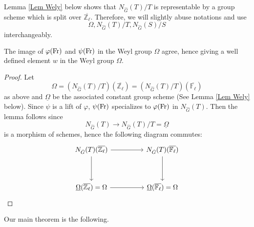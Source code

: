 \begin{remark}
	Lemma \ref{Lem Wely} below shows that $N_{\hat{G}}(T)/T$ is representable by a group scheme which is split over $\overline{\mathbb{Z}_{\ell}}$. Therefore, we will slightly abuse notations and use 
	$$\Omega, N_{\hat{G}}(T)/T, N_{\hat{G}}(S)/S$$
	interchangeably.
\end{remark}

\begin{lemma}\label{Lemma w}
	The image of $\varphi(\operatorname{Fr})$ and $\psi(\operatorname{Fr})$ in the Weyl group $\Omega$ agree, hence giving a well defined element $w$ in the Weyl group $\Omega$.
\end{lemma}

\begin{proof}
	Let 
	$$\Omega=\left(N_{\hat{G}}(T)/T\right)(\overline{\mathbb{Z}_{\ell}}) = \left(N_{\hat{G}}(T)/T\right)(\overline{\mathbb{F}_{\ell}})$$ 
	as above and $\underline{\Omega}$ be the associated constant group scheme (See Lemma \ref{Lem Wely} below). Since $\psi$ is a lift of $\varphi$, $\psi(\operatorname{Fr})$ specializes to $\varphi(\operatorname{Fr})$ in $N_{\hat{G}}(T)$. Then the lemma follows since 
	$$N_{\hat{G}}(T) \to N_{\hat{G}}(T)/T=\underline{\Omega}$$
	is a morphism of schemes, hence the following diagram commutes:
	$$
	\begin{tikzcd}
		{N_{\hat{G}}(T)(\overline{\mathbb{Z}_\ell})} && {N_{\hat{G}}(T)(\overline{\mathbb{F}_\ell})} \\
		\\
		{\underline{\Omega}(\overline{\mathbb{Z}_\ell})=\Omega} && {\underline{\Omega}(\overline{\mathbb{F}_\ell})=\Omega}
		\arrow[from=1-1, to=1-3]
		\arrow[from=1-1, to=3-1]
		\arrow[from=3-1, to=3-3]
		\arrow[from=1-3, to=3-3]
	\end{tikzcd}
$$
\end{proof}

Our main theorem is the following.

